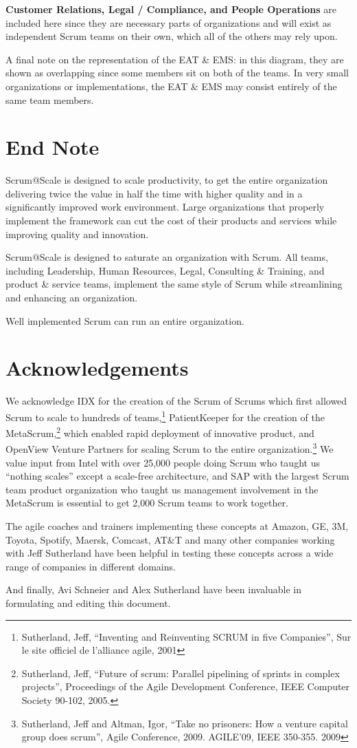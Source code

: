 \documentclass[12pt,a4paper,parskip=full]{scrartcl}
\begin{document}
\textbf{Customer Relations, Legal / Compliance, and People Operations} are
included here since they are necessary parts of organizations and will
exist as independent Scrum teams on their own, which all of the others may
rely upon.

A final note on the representation of the EAT \& EMS: in this diagram, they
are shown as overlapping since some members sit on both of the teams. In very
small organizations or implementations, the EAT \& EMS may consist entirely
of the same team members.

\section{End Note}
Scrum@Scale is designed to scale productivity, to get the entire
organization delivering twice the value in half the time with higher quality and
in a significantly improved work environment. Large organizations that
properly implement the framework can cut the cost of their products and
services while improving quality and innovation.

Scrum@Scale is designed to saturate an organization with Scrum. All teams,
including Leadership, Human Resources, Legal, Consulting \& Training, and
product \& service teams, implement the same style of Scrum while
streamlining and enhancing an organization.

Well implemented Scrum can run an entire organization.

\section{Acknowledgements}
We acknowledge IDX for the creation of the Scrum of Scrums which first
allowed Scrum to scale to hundreds of teams,\footnote{Sutherland, Jeff,
``Inventing and Reinventing SCRUM in five Companies'', Sur le site officiel
de l'alliance agile, 2001} PatientKeeper for the creation of the
MetaScrum,\footnote{Sutherland, Jeff, ``Future of scrum: Parallel pipelining
of sprints in complex projects'', Proceedings of the Agile Development
Conference,  IEEE Computer Society 90-102,  2005.} which enabled rapid
deployment of innovative product, and OpenView Venture Partners for scaling
Scrum to the entire organization.\footnote{Sutherland, Jeff and Altman,
Igor, ``Take no prisoners: How a venture capital group does scrum'', Agile
Conference, 2009. AGILE'09, IEEE 350-355.  2009} We value input from Intel
with over 25,000 people doing Scrum who taught us ``nothing scales'' except
a scale-free architecture, and SAP with the largest Scrum team product
organization who taught us management involvement in the MetaScrum is
essential to get 2,000 Scrum teams to work together.

The agile coaches and trainers implementing these concepts at Amazon, GE,
3M, Toyota, Spotify, Maersk, Comcast, AT\&T and many other companies working with Jeff Sutherland
have been helpful in testing these concepts across a wide range of
companies in different domains.

And finally, Avi Schneier and Alex Sutherland have been invaluable in
formulating and editing this document.

\pagebreak

\printbibliography
\end{document}

